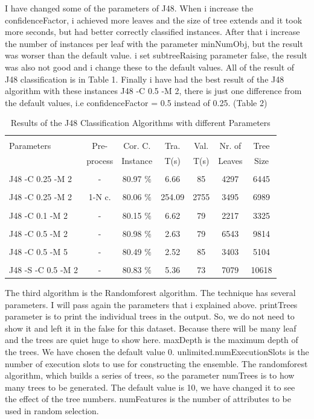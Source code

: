 \documentclass[a4paper]{article}
\begin{document}
I have changed some of the parameters of J48. When i increase the
confidenceFactor, i achieved more leaves and the size of tree extends and it
took more seconds, but had better correctly classified instances. After that i
increase the number of instances per leaf with the parameter minNumObj, but the
result was worser than the default value. i set subtreeRaising parameter false,
the result was also not good and i change these to the default values. All of
the result of J48 classification is in Table 1. Finally i have had the best
result of the J48 algorithm with these instances J48 -C 0.5 -M 2, there is just
one difference from the default values, i.e confidenceFactor = 0.5 instead of
0.25. (Table 2) 

\begin{table}
\begin{tabular}{|l| c | c | c | c |c |c |}

\hline & & & & & & \\
Parameters & Pre- & Cor. C.& Tra. & Val. & Nr. of  &  Tree  \\
 & process  & Instance & T(s) &  T(s) & Leaves & Size \\
\hline & & & & & & \\
J48 -C 0.25 -M 2 	 & - &			80.97  $\%$ & 6.66 & 85 & 4297  & 6445 \\ 
\hline & & & & & & \\
J48 -C 0.25 -M 2 	& 1-N c. &	80.06 $\%$ & 254.09 & 2755 & 3495  & 6989  \\ 
\hline & & & & & & \\
J48 -C 0.1 -M 2 	 & - &			80.15  $\%$ & 6.62 & 79 &  2217 & 3325\\ 
\hline & & & & & & \\
J48 -C 0.5 -M 2 	& - &			80.98 $\%$ & 2.63 & 79 &  6543 & 9814 \\ 
\hline & & & & & & \\
J48 -C 0.5 -M 5  	 & - &			80.49 $\%$ & 2.52 & 85 &  3403 & 5104 \\ 
\hline & & & & & & \\
J48 -S -C 0.5 -M 2 	& -&			 80.83 $\%$ & 5.36 &  73 & 7079 & 10618\\ 
\hline
\end{tabular}
\caption{Results of the J48 Classification Algorithms with different Parameters}
\end{table}

The third algorithm is the Randomforest algorithm. The technique has several
parameters. I will pass again the parameters that i explained above. printTrees
parameter is to print the individual trees in the output. So, we do not need to
show it and left it in the false for this dataset. Because there will be many
leaf and the trees are quiet huge to show here. maxDepth is the maximum depth
of the trees. We have chosen the default value 0. unlimited.numExecutionSlots
is the number of execution slots to use for constructing the ensemble. The
randomforest algorithm, which builds a series of trees, so the parameter
numTrees is to how many trees to be generated. The default value is 10, we have
changed it to see the effect of the tree numbers. numFeatures is the number of
attributes to be used in random selection. 
\end{document}
